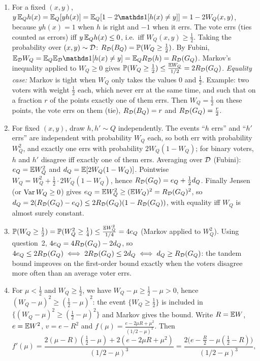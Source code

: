 \documentclass[11pt]{article}
\begin{document}
\begin{solution}
\begin{enumerate}
\item For a fixed $(x,y)$, $y\,\E_Qh(x)=\E_Q[yh(x)]=\E_Q[1-2\ind{h(x)\neq y}]=1-2W_Q(x,y)$, because $yh(x)=1$ when
      $h$ is right and $-1$ when it errs. The vote errs (ties counted as errors) iff $y\,\mathbb{E}_Qh(x)\leq0$, i.e.\ iff
      $W_Q(x,y)\geq\frac12$. Taking the probability over $(x,y)\sim\mathcal{D}$: $R_{\mathcal{D}}(B_{Q})=\mathbb{P}(W_Q\geq\frac12)$. By Fubini,
      $\E_\D W_Q=\E_Q\E_\D\ind{h(x)\neq y}=\E_Q\RD(h)=\RD(\GQ)$. Markov's inequality applied to $W_Q\geq0$ gives
      $\mathbb{P}(W_Q\geq\frac12)\leq\frac{\mathbb{E} W_Q}{1/2}=2R_{\mathcal{D}}(G_{Q})$.
      \emph{Equality case:} Markov is tight when $W_Q$ only takes the values $0$ and $\frac12$. Example: two voters
      with weight $\frac12$ each, which never err at the same time, and such that on a fraction $r$ of the points
      exactly one of them errs. Then $W_Q=\frac12$ on these points, the vote errs on them (tie), $R_{\mathcal{D}}(B_{Q})=r$ and
      $R_{\mathcal{D}}(G_{Q})=\frac r2$.
\item For fixed $(x,y)$, draw $h,h'\sim Q$ independently. The events ``$h$ errs'' and ``$h'$ errs'' are independent
      with probability $W_Q$ each, so both err with probability $W_Q^2$, and exactly one errs with probability
      $2W_Q(1-W_Q)$; for binary voters, $h$ and $h'$ disagree iff exactly one of them errs. Averaging over $\mathcal{D}$ (Fubini):
      $e_Q=\mathbb{E} W_Q^2$ and $d_Q=\mathbb{E}[2W_Q(1-W_Q)]$. Pointwise $W_Q=W_Q^2+\frac12\cdot2W_Q(1-W_Q)$, hence
      $R_{\mathcal{D}}(G_{Q})=e_Q+\frac12d_Q$. Finally Jensen (or $\operatorname{Var} W_Q\geq0$) gives $e_Q=\mathbb{E} W_Q^2\geq(\mathbb{E} W_Q)^2=R_{\mathcal{D}}(G_{Q})^2$,
      so $d_Q=2(R_{\mathcal{D}}(G_{Q})-e_Q)\leq2R_{\mathcal{D}}(G_{Q})(1-R_{\mathcal{D}}(G_{Q}))$, with equality iff $W_Q$ is almost surely constant.
\item $\mathbb{P}(W_Q\geq\frac12)=\mathbb{P}(W_Q^2\geq\frac14)\leq\frac{\mathbb{E} W_Q^2}{1/4}=4e_Q$ (Markov applied to $W_Q^2$). Using question~2,
      $4e_Q=4R_{\mathcal{D}}(G_{Q})-2d_Q$, so $4e_Q\leq2R_{\mathcal{D}}(G_{Q})\iff2R_{\mathcal{D}}(G_{Q})\leq2d_Q\iff d_Q\geq R_{\mathcal{D}}(G_{Q})$: the tandem bound improves on
      the first-order bound exactly when the voters disagree more often than an average voter errs.
\item For $\mu<\frac12$ and $W_Q\geq\frac12$, we have $W_Q-\mu\geq\frac12-\mu>0$, hence $(W_Q-\mu)^2\geq(\frac12-\mu)^2$: the
      event $\{W_Q\geq\frac12\}$ is included in $\{(W_Q-\mu)^2\geq(\frac12-\mu)^2\}$ and Markov gives the bound. Write $R=\mathbb{E} W$,
      $e=\mathbb{E} W^2$, $v=e-R^2$ and $f(\mu)=\frac{e-2\mu R+\mu^2}{(1/2-\mu)^2}$. Then
      \[f'(\mu)=\frac{2(\mu-R)(\frac12-\mu)+2(e-2\mu R+\mu^2)}{(1/2-\mu)^3}=\frac{2\big(e-\frac R2-\mu(\frac12-R)\big)}{(1/2-\mu)^3},\]

\end{enumerate}
\end{solution}
\end{document}
